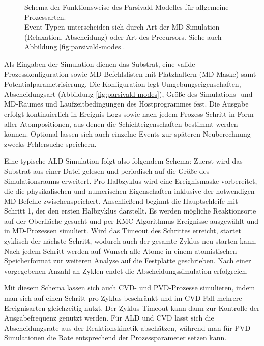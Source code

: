 \begin{figure}
  \centering
  \def\svgwidth{\textwidth}
  
  \caption[Parsivald-Funktionsweise asd]{
    Schema der Funktionsweise des Parsivald-Modelles für allgemeine Prozessarten.
    \\
    Event-Typen unterscheiden sich durch Art der MD-Simulation (Relaxation, Abscheidung) oder Art des Precursors.
    Siehe auch Abbildung \ref{fig:parsivald-modes}.
  }
  \label{fig:parsivald-stephierarchy}
\end{figure}

Als Eingaben der Simulation dienen das Substrat, eine valide Prozesskonfiguration sowie MD-Befehlslisten mit Platzhaltern (MD-Maske) samt Potentialparametrisierung.
Die Konfiguration legt Umgebungseigenschaften, Abscheidungsart (Abbildung \ref{fig:parsivald-modes}), Größe des Simulations- und MD-Raumes und Laufzeitbedingungen des Hostprogrammes fest.
Die Ausgabe erfolgt kontinuierlich in Ereignis-Logs sowie nach jedem Prozess-Schritt in Form aller Atompositionen, aus denen die Schichteigenschaften bestimmt werden können.
Optional lassen sich auch einzelne Events zur späteren Neuberechnung zwecks Fehlersuche speichern.

Eine typische ALD-Simulation folgt also folgendem Schema:
Zuerst wird das Substrat aus einer Datei gelesen und periodisch auf die Größe des Simulationsraums erweitert.
Pro Halbzyklus wird eine Ereignismaske vorbereitet, die die physikalischen und numerischen Eigenschaften inklusive der notwendigen MD-Befehle zwischenspeichert.
Anschließend beginnt die Hauptschleife mit Schritt 1, der den ersten Halbzyklus darstellt.
Es werden mögliche Reaktionsorte auf der Oberfläche gesucht und per KMC-Algorithmus Ereignisse ausgewählt und in MD-Prozessen simuliert.
Wird das Timeout des Schrittes erreicht, startet zyklisch der nächste Schritt, wodurch auch der gesamte Zyklus neu starten kann.
Nach jedem Schritt werden auf Wunsch alle Atome in einem atomistischen Speicherformat zur weiteren Analyse auf die Festplatte geschrieben.
Nach einer vorgegebenen Anzahl an Zyklen endet die Abscheidungssimulation erfolgreich.

Mit diesem Schema lassen sich auch CVD- und PVD-Prozesse simulieren, indem man sich auf einen Schritt pro Zyklus beschränkt und im CVD-Fall mehrere Ereignisarten gleichzeitig nutzt.
Der Zyklus-Timeout kann dann zur Kontrolle der Ausgabefrequenz genutzt werden.
Für ALD und CVD lässt sich die Abscheidungsrate aus der Reaktionskinetik abschätzen, während man für PVD-Simulationen die Rate entsprechend der Prozessparameter setzen kann.


